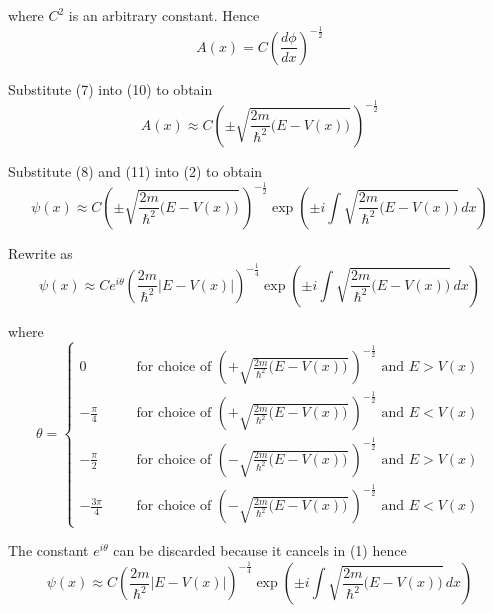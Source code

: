 where $C^2$ is an arbitrary constant. Hence
\begin{equation*}
A(x)=C\left(\frac{d\phi}{dx}\right)^{-\frac{1}{2}}
\tag{10}
\end{equation*}

Substitute (7) into (10) to obtain
\begin{equation*}
A(x)\approx C
\left(\pm\sqrt{\frac{2m}{\hbar^2}\bigl(E-V(x)\bigr)}\,\right)^{-\frac{1}{2}}
\tag{11}
\end{equation*}

Substitute (8) and (11) into (2) to obtain
\begin{equation*}
\psi(x)\approx C
\left(\pm\sqrt{\frac{2m}{\hbar^2}\bigl(E-V(x)\bigr)}\,\right)^{-\frac{1}{2}}
\exp\left(\pm i\int\sqrt{\frac{2m}{\hbar^2}\bigl(E-V(x)\bigr)}\,dx\right)
\end{equation*}

Rewrite as
\begin{equation*}
\psi(x)\approx Ce^{i\theta}
\left(\frac{2m}{\hbar^2}\bigl|E-V(x)\bigr|\right)^{-\frac{1}{4}}
\exp\left(\pm i\int\sqrt{\frac{2m}{\hbar^2}\bigl(E-V(x)\bigr)}\,dx\right)
\tag{12}
\end{equation*}

where
\begin{equation*}
\theta=\left\{
\begin{aligned}
0& &
&\text{for choice of $\left(+\sqrt{\frac{2m}{\hbar^2}\bigl(E-V(x)\bigr)}\,\right)^{-\frac{1}{2}}$ and $E>V(x)$}
\\[1ex]
-\frac{\pi}{4}& &
&\text{for choice of $\left(+\sqrt{\frac{2m}{\hbar^2}\bigl(E-V(x)\bigr)}\,\right)^{-\frac{1}{2}}$ and $E<V(x)$}
\\[1ex]
-\frac{\pi}{2}& &
&\text{for choice of $\left(-\sqrt{\frac{2m}{\hbar^2}\bigl(E-V(x)\bigr)}\,\right)^{-\frac{1}{2}}$ and $E>V(x)$}
\\[1ex]
-\frac{3\pi}{4}& &
&\text{for choice of $\left(-\sqrt{\frac{2m}{\hbar^2}\bigl(E-V(x)\bigr)}\,\right)^{-\frac{1}{2}}$ and $E<V(x)$}
\end{aligned}
\right.
\end{equation*}

The constant $e^{i\theta}$ can be discarded because it cancels in (1) hence
\begin{equation*}
\psi(x)\approx C
\left(\frac{2m}{\hbar^2}\bigl|E-V(x)\bigr|\right)^{-\frac{1}{4}}
\exp\left(\pm i\int\sqrt{\frac{2m}{\hbar^2}\bigl(E-V(x)\bigr)}\,dx\right)
\end{equation*}


